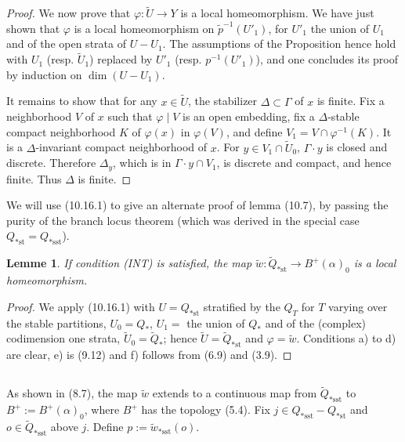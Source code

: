 \documentclass[12pt,a4paper]{article}
\theoremstyle{plain}
\newtheorem{lemma}[theorem]{Lemme}
\theoremstyle{definition}
\theoremstyle{remark}
\begin{document}
\begin{proof}
We now prove that $\varphi : \widetilde{U} \to Y$ is a local homeomorphism. We have just shown that $\varphi$ is a local homeomorphism on $\widetilde{p}^{-1}(U'_1)$, for $U'_1$ the union of $U_1$ and of the open strata of $U - U_1$. The assumptions of the Proposition hence hold with $U_1$ (resp. $\widetilde{U}_1$) replaced by $U'_1$ (resp. $p^{-1}(U'_1)$), and one concludes its proof by induction on $\dim(U - U_1)$.

It remains to show that for any $x \in \widetilde{U}$, the stabilizer $\Delta \subset \Gamma$ of $x$ is finite. Fix a neighborhood $V$ of $x$ such that $\varphi \mid V$ is an open embedding, fix a $\Delta$-stable compact neighborhood $K$ of $\varphi(x)$ in $\varphi(V)$, and define $V_1 = V \cap \varphi^{-1}(K)$. It is a $\Delta$-invariant compact neighborhood of $x$. For $y \in V_1 \cap \widetilde{U}_0$, $\Gamma \cdot y$ is closed and discrete. Therefore $\Delta_y$, which is in $\Gamma \cdot y \cap V_1$, is discrete and compact, and hence finite. Thus $\Delta$ is finite.
\end{proof}

We will use (10.16.1) to give an alternate proof of lemma (10.7), by passing the purity of the branch locus theorem (which was derived in the special case $Q_{*\text{st}} = Q_{*\text{sst}}$).

\begin{lemma}
\label{10.17}
If condition (INT) is satisfied, the map $\widetilde{w} : \widetilde{Q}_{*\text{st}} \to B^+(\alpha)_0$ is a local homeomorphism.
\end{lemma}

\begin{proof}
We apply (10.16.1) with $U = Q_{*\text{st}}$ stratified by the $Q_T$ for $T$ varying over the stable partitions, $U_0 = Q_*$, $U_1 =$ the union of $Q_*$ and of the (complex) codimension one strata, $\widetilde{U}_0 = \widetilde{Q}_*$; hence $\widetilde{U} = \widetilde{Q}_{*\text{st}}$ and $\varphi = \widetilde{w}$. Conditions a) to d) are clear, e) is (9.12) and f) follows from (6.9) and (3.9).
\end{proof}

\subsection{}
\label{10.18}

As shown in (8.7), the map $\widetilde{w}$ extends to a continuous map from $\widetilde{Q}_{*\text{sst}}$ to $B^+ := B^+(\alpha)_0$, where $B^+$ has the topology (5.4). Fix $j \in Q_{*\text{sst}} - Q_{*\text{st}}$ and $o \in \widetilde{Q}_{*\text{sst}}$ above $j$. Define $p := \widetilde{w}_{*\text{sst}}(o)$.
\end{document}
